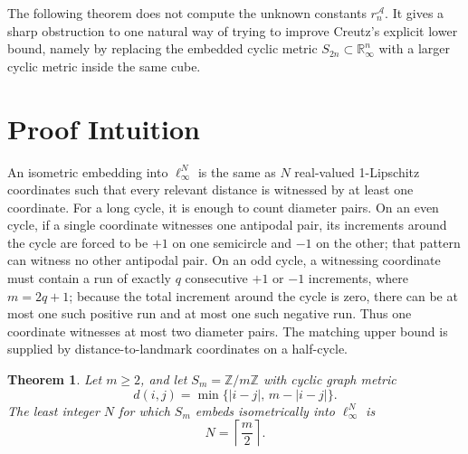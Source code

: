 \documentclass[11pt]{article}
\newtheorem{theorem}{Theorem}
\newcommand{\Z}{\mathbb Z}
\newcommand{\R}{\mathbb R}
\begin{document}
The following theorem does not compute the unknown constants $r_n^{\mathcal A}$. It gives a sharp obstruction to one natural way of trying to improve Creutz's explicit lower bound, namely by replacing the embedded cyclic metric $S_{2n}\subset \R_\infty^n$ with a larger cyclic metric inside the same cube.

\section*{Proof Intuition}

An isometric embedding into $\ell_\infty^N$ is the same as $N$ real-valued 1-Lipschitz coordinates such that every relevant distance is witnessed by at least one coordinate. For a long cycle, it is enough to count diameter pairs. On an even cycle, if a single coordinate witnesses one antipodal pair, its increments around the cycle are forced to be $+1$ on one semicircle and $-1$ on the other; that pattern can witness no other antipodal pair. On an odd cycle, a witnessing coordinate must contain a run of exactly $q$ consecutive $+1$ or $-1$ increments, where $m=2q+1$; because the total increment around the cycle is zero, there can be at most one such positive run and at most one such negative run. Thus one coordinate witnesses at most two diameter pairs. The matching upper bound is supplied by distance-to-landmark coordinates on a half-cycle.

\begin{theorem}
\label{thm:linf-dimension-cycle}
Let $m\geq 2$, and let $S_m=\Z/m\Z$ with cyclic graph metric
\[
  d(i,j)=\min\{|i-j|,\,m-|i-j|\}.
\]
The least integer $N$ for which $S_m$ embeds isometrically into $\ell_\infty^N$ is
\[
  N=\left\lceil \frac{m}{2}\right\rceil .
\]
\end{theorem}
\end{document}
